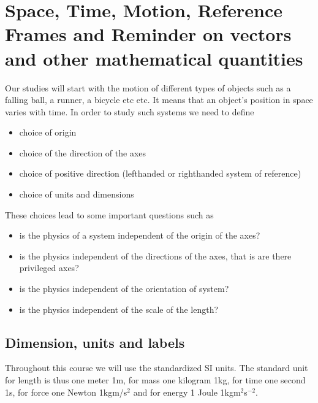 \documentclass[letterpaper,10pt,english]{sphinxmanual}
\begin{document}
\section{Space, Time, Motion, Reference Frames  and Reminder on vectors and other mathematical quantities}
\label{\detokenize{chapter2:space-time-motion-reference-frames-and-reminder-on-vectors-and-other-mathematical-quantities}}\label{\detokenize{chapter2::doc}}
Our studies will start with the motion of different types of objects
such as a falling ball, a runner, a bicycle etc etc. It means that an
object’s position in space varies with time.
In order to study such systems we need to define
\begin{itemize}
\item {} 
choice of origin

\item {} 
choice of the direction of the axes

\item {} 
choice of positive direction (left\sphinxhyphen{}handed or right\sphinxhyphen{}handed system of reference)

\item {} 
choice of units and dimensions

\end{itemize}

These choices lead to some important questions such as
\begin{itemize}
\item {} 
is the  physics of a system independent of the origin of the axes?

\item {} 
is the  physics independent of the directions of the axes, that is are there privileged axes?

\item {} 
is the physics independent of the orientation of system?

\item {} 
is the physics independent of the scale of the length?

\end{itemize}


\subsection{Dimension, units and labels}
\label{\detokenize{chapter2:dimension-units-and-labels}}
Throughout this course we will use the standardized SI units. The standard unit for length is thus one meter 1m, for mass
one kilogram 1kg, for time one second 1s, for force one Newton 1kgm/s\(^2\) and for energy 1 Joule 1kgm\(^2\)s\(^{-2}\).
\end{document}
